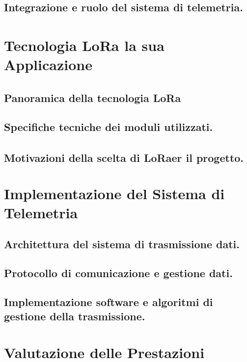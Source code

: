 \documentclass[12pt,a4paper,twoside]{book}
\begin{document}
\section{Integrazione e ruolo del sistema di telemetria.}

\chapter{Tecnologia \texorpdfstring{LoRa\textsuperscript{\textcopyright}} e la sua Applicazione} \label{chap:lora}

\section{Panoramica della tecnologia \texorpdfstring{LoRa\textsuperscript{\textcopyright}}.}
\cite{Andrade2022}
\section{Specifiche tecniche dei moduli utilizzati.}
\section{Motivazioni della scelta di \texorpdfstring{LoRa\textsuperscript{\textcopyright}} per il progetto.}

\chapter{Implementazione del Sistema di Telemetria} \label{chap:telemetry}

\section{Architettura del sistema di trasmissione dati.}
\section{Protocollo di comunicazione e gestione dati.}
\section{Implementazione software e algoritmi di gestione della trasmissione.}

\chapter{Valutazione delle Prestazioni} \label{chap:performance}
\end{document}
